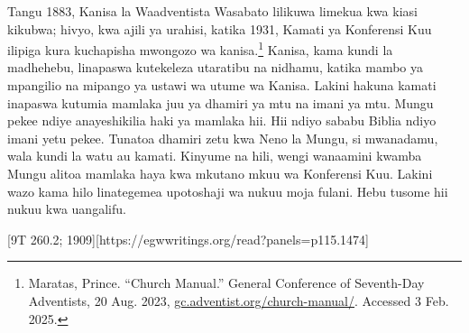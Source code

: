 Tangu 1883, Kanisa la Waadventista Wasabato lilikuwa limekua kwa kiasi kikubwa; hivyo, kwa ajili ya urahisi, katika 1931, Kamati ya Konferensi Kuu ilipiga kura kuchapisha mwongozo wa kanisa.\footnote{Maratas, Prince. “Church Manual.” General Conference of Seventh-Day Adventists, 20 Aug. 2023, \href{https://gc.adventist.org/church-manual/}{gc.adventist.org/church-manual/}. Accessed 3 Feb. 2025.} Kanisa, kama kundi la madhehebu, linapaswa kutekeleza utaratibu na nidhamu, katika mambo ya mpangilio na mipango ya ustawi wa utume wa Kanisa. Lakini hakuna kamati inapaswa kutumia mamlaka juu ya dhamiri ya mtu na imani ya mtu. Mungu pekee ndiye anayeshikilia haki ya mamlaka hii. Hii ndiyo sababu Biblia ndiyo imani yetu pekee. Tunatoa dhamiri zetu kwa Neno la Mungu, si mwanadamu, wala kundi la watu au kamati. Kinyume na hili, wengi wanaamini kwamba Mungu alitoa mamlaka haya kwa mkutano mkuu wa Konferensi Kuu. Lakini wazo kama hilo linategemea upotoshaji wa nukuu moja fulani. Hebu tusome hii nukuu kwa uangalifu.

[9T 260.2; 1909][https://egwwritings.org/read?panels=p115.1474]

